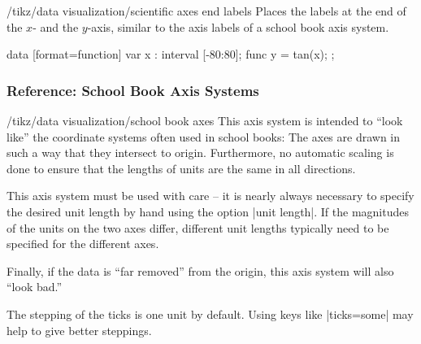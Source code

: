 \begin{key}{/tikz/data visualization/scientific axes end labels}
  Places the labels at the end of the $x$- and the $y$-axis, similar
  to the axis labels of a school book axis system.
\begin{codeexample}[width=8cm]
\tikz \datavisualization [
  scientific clean axes,
  visualize as smooth line,
  scientific axes end labels,
  x axis={label=degree $d$,
    ticks={tick unit={}^\circ}},
  y axis={label=$\tan d$}]
data [format=function] {
  var x : interval [-80:80];
  func y = tan(\value x);
};
\end{codeexample}
\end{key}



\subsubsection{Reference: School Book Axis Systems}

\begin{key}{/tikz/data visualization/school book axes}
  This axis system is intended to ``look like'' the coordinate systems
  often used in school books: The axes are drawn in such a way that
  they intersect to origin. Furthermore, no automatic
  scaling is done to ensure that the lengths of units are the same in
  all directions.

  This axis system must be used with care -- it is nearly always
  necessary to specify the desired unit length by hand using the
  option |unit length|. If the magnitudes of the units on the two axes
  differ, different unit lengths typically need to be specified for
  the different axes.

  Finally, if the data is ``far removed'' from the origin, this
  axis system will also ``look bad.''

\begin{codeexample}[]
\end{codeexample}

  The stepping of the ticks is one unit by default. Using keys like
  |ticks=some| may help to give better steppings.
\end{key}


